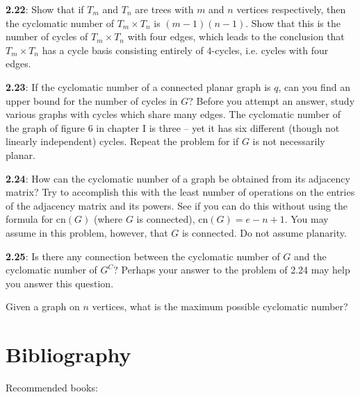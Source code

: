 \documentclass{article}
\begin{document}
\vspace{0.5cm}

\textbf{2.22}: Show that if $T_m$ and $T_n$ are trees with $m$ and $n$ vertices respectively, then the cyclomatic number of $T_m \times T_n$ is $(m-1)(n-1)$. Show that this is the number of cycles of $T_m \times T_n$ with four edges, which leads to the conclusion that $T_m \times T_n$ has a cycle basis consisting entirely of $4$-cycles, i.e. cycles with four edges.

\vspace{0.5cm}

\textbf{2.23}: If the cyclomatic number of a connected planar graph is $q$, can you find an upper bound for the number of cycles in $G$? Before you attempt an answer, study various graphs with cycles which share many edges. The cyclomatic number of the graph of figure 6 in chapter I is three -- yet it has six different (though not linearly independent) cycles. Repeat the problem for if $G$ is not necessarily planar.

\vspace{0.5cm}

\textbf{2.24}: How can the cyclomatic number of a graph be obtained from its adjacency matrix? Try to accomplish this with the least number of operations on the entries of the adjacency matrix and its powers. See if you can do this without using the formula for $\text{cn}(G)$ (where $G$ is connected), $\text{cn}(G)=e-n+1$. You may assume in this problem, however, that $G$ is connected. Do not assume planarity.

\vspace{0.5cm}

\textbf{2.25}: Is there any connection between the cyclomatic number of $G$ and the cyclomatic number of $G^C$? Perhaps your answer to the problem of 2.24 may help you answer this question.

Given a graph on $n$ vertices, what is the maximum possible cyclomatic number?


\newpage

\section*{Bibliography}


Recommended books:
\end{document}
